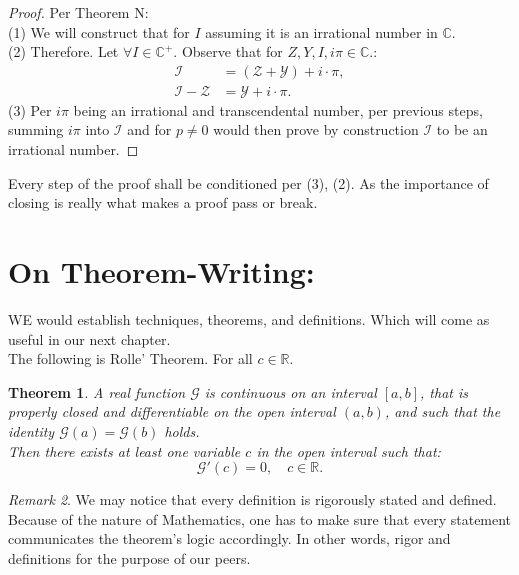 \documentclass[10pt]{article}
\theoremstyle{plain}
\newtheorem{theorem}{Theorem}[section]
\theoremstyle{definition}
\theoremstyle{remark}
\newtheorem{remark}[theorem]{Remark}
\begin{document}
\begin{proof}
	Per Theorem N:\\
	(1) We will construct that for $I$ assuming it is an irrational number in $\mathbb{C}$.\\
	(2) Therefore. Let $\forall I \in \mathbb{C}^{+}.$ Observe that for $Z, Y, I, i\pi \in \mathbb{C}.$:
	\begin{align*}
		\mathcal{I} &= (\mathcal{Z}+\mathcal{Y})+i \cdot \pi,\\
		\mathcal{I}-\mathcal{Z} &= \mathcal{Y}+i \cdot \pi.
	\end{align*}
	(3) Per $i\pi$ being an irrational and transcendental number, per previous steps, summing $i\pi$ into $\mathcal{I}$ and for $p \neq 0$ would then prove by construction $\mathcal{I}$ to be an irrational number.
\end{proof}
Every step of the proof shall be conditioned per (3), (2). As the importance of closing is really what makes a proof pass or break.

\section{On Theorem-Writing:}

\lettrine[lines=2, lhang=0.1, loversize=0.2]{W}E would establish techniques, theorems, and definitions. Which will come as useful in our next chapter.\\
The following is Rolle' Theorem. For all $c \in \mathbb{R}.$

\begin{theorem}
	A real function $\mathcal{G}$ is continuous on an interval $[a, b]$, that is properly closed and differentiable on the open interval $(a, b)$, and such that the identity $\mathcal{G}(a) = \mathcal{G}(b)$ holds.\\Then there exists at least one variable $c$ in the open interval such that:
	\begin{equation}
		\mathcal{G}'(c) = 0, \quad c \in \mathbb{R}.
	\end{equation}
\end{theorem}

\begin{remark}
We may notice that every definition is rigorously stated and defined. Because of the nature of Mathematics, one has to make sure that every statement communicates the theorem's logic accordingly. In other words, rigor and definitions for the purpose of our peers.
\end{remark}
\end{document}
